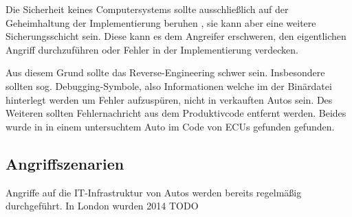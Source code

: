 Die Sicherheit keines Computersystems sollte ausschließlich auf der
Geheimhaltung der Implementierung beruhen \cite{ServerSecurity2008}, sie kann
aber eine weitere Sicherungsschicht sein. Diese kann es dem Angreifer
erschweren, den eigentlichen Angriff durchzuführen oder Fehler in der
Implementierung verdecken.

Aus diesem Grund sollte das Reverse-Engineering schwer sein. Insbesondere
sollten sog. Debugging-Symbole, also Informationen welche im der Binärdatei
hinterlegt werden um Fehler aufzuspüren, nicht in verkauften Autos sein. Des
Weiteren sollten Fehlernachricht aus dem Produktivcode entfernt werden. Beides
wurde in \cite{Checkoway2011} in einem untersuchtem Auto im Code von ECUs
gefunden gefunden.


\subsection{Angriffszenarien}
Angriffe auf die IT-Infrastruktur von Autos werden bereits regelmäßig
durchgeführt. In London wurden 2014 TODO